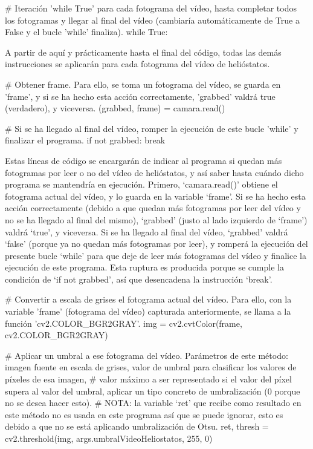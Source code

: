 \# Iteración 'while True' para cada fotograma del vídeo, hasta completar todos los fotogramas y llegar al final del vídeo (cambiaría automáticamente de True a False y el bucle 'while' finaliza).
while True:

A partir de aquí y prácticamente hasta el final del código, todas las demás instrucciones se aplicarán para cada fotograma del vídeo de helióstatos.

    
    \# Obtener frame. Para ello, se toma un fotograma del vídeo, se guarda en 'frame', y si se ha hecho esta acción correctamente, 'grabbed' valdrá true (verdadero), y viceversa.
    (grabbed, frame) = camara.read()

    \# Si se ha llegado al final del vídeo, romper la ejecución de este bucle 'while' y finalizar el programa.
    if not grabbed:
        break

Estas líneas de código se encargarán de indicar al programa si quedan más fotogramas por leer o no del vídeo de helióstatos, y así saber hasta cuándo dicho programa se mantendría en ejecución. Primero, ‘camara.read()’ obtiene el fotograma actual del vídeo, y lo guarda en la variable ‘frame’. Si se ha hecho esta acción correctamente (debido a que quedan más fotogramas por leer del vídeo y no se ha llegado al final del mismo), ‘grabbed’ (justo al lado izquierdo de ‘frame’) valdrá ‘true’, y viceversa. Si se ha llegado al final del vídeo, ‘grabbed’ valdrá ‘false’ (porque ya no quedan más fotogramas por leer), y romperá la ejecución del presente bucle ‘while’ para que deje de leer más fotogramas del vídeo y finalice la ejecución de este programa. Esta ruptura es producida porque se cumple la condición de ‘if not grabbed’, así que desencadena la instrucción ‘break’.


    \# Convertir a escala de grises el fotograma actual del vídeo. Para ello, con la variable 'frame' (fotograma del vídeo) capturada anteriormente, se llama a la función 'cv2.COLOR\_BGR2GRAY'.
    img = cv2.cvtColor(frame, cv2.COLOR\_BGR2GRAY)
    
    \# Aplicar un umbral a ese fotograma del vídeo. Parámetros de este método: imagen fuente en escala de grises, valor de umbral para clasificar los valores de píxeles de esa imagen,
    \# valor máximo a ser representado si el valor del píxel supera al valor del umbral, aplicar un tipo concreto de umbralización (0 porque no se desea hacer esto).
    \# NOTA: la variable ‘ret’ que recibe como resultado en este método no es usada en este programa así que se puede ignorar, esto es debido a que no se está aplicando umbralización de Otsu.
    ret, thresh = cv2.threshold(img, args.umbralVideoHeliostatos, 255, 0)
    
